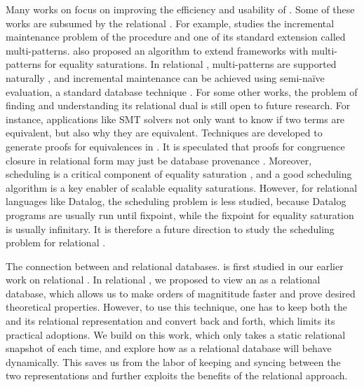 Many works on \egraphs focus on improving the efficiency and usability of \egraphs.
Some of these works are subsumed by the relational \egraphs.
For example, \citep{efficient-ematching} studies 
 the incremental maintenance problem of the \ematching procedure
 and one of its standard extension called multi-patterns.
\citet{tensat} also proposed an algorithm 
 to extend \egraph frameworks with multi-patterns for equality saturations.
In relational \egraphs, multi-patterns are supported naturally \citep{relational-ematching},
 and incremental maintenance can be achieved using semi-na\"ive evaluation,
 a standard database technique \citep{datalog-survey}.
For some other works, 
 the problem of finding and understanding its relational dual 
 is still open to future research.
For instance,
 applications like SMT solvers not only want to know if two terms are equivalent, 
 but also why they are equivalent.
Techniques are developed to generate proofs for equivalences in \egraphs \citep{proof-producing}.
It is speculated that proofs for congruence closure in relational form 
 may just be database provenance \citep{prov-semiring,prov-souffle}.
Moreover,
 scheduling is a critical component of equality saturation \citep{egg}, 
 and a good scheduling algorithm is a key enabler of scalable equality saturations.
However, 
 for relational languages like Datalog,
 the scheduling problem is less studied,
 because Datalog programs are usually run until fixpoint,
 while the fixpoint for equality saturation is usually infinitary.
It is therefore a future direction to study the scheduling problem for relational \egraphs.

The connection between \egraphs and relational databases.
 is first studied in our earlier work on relational \ematching\citep{relational-ematching}.
In relational \ematching, 
 we proposed to view an \egraph as a relational database,
 which allows us to make \ematching orders of magnititude faster
 and prove desired theoretical properties.
However, to use this technique,
 one has to keep both the \egraph and its relational representation 
 and convert back and forth, which limits its practical adoptions.
We build on this work, 
 which only takes a static relational snapshot of \egraph each time,
 and explore how \egraphs as a relational database will behave dynamically.
This saves us from the labor of keeping and syncing between the two \egraph representations
 and further exploits the benefits of the relational \ematching approach.

